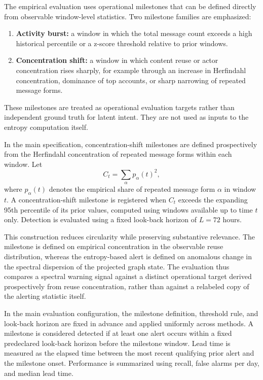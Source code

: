 \documentclass[sigconf]{acmart}
\begin{document}
The empirical evaluation uses operational milestones that can be defined directly from observable window-level statistics. Two milestone families are emphasized:
\begin{enumerate}
    \item \textbf{Activity burst:} a window in which the total message count exceeds a high historical percentile or a z-score threshold relative to prior windows.
    \item \textbf{Concentration shift:} a window in which content reuse or actor concentration rises sharply, for example through an increase in Herfindahl concentration, dominance of top accounts, or sharp narrowing of repeated message forms.
\end{enumerate}

These milestones are treated as operational evaluation targets rather than independent ground truth for latent intent. They are not used as inputs to the entropy computation itself.

In the main specification, concentration-shift milestones are defined prospectively from the Herfindahl concentration of repeated message forms within each window. Let
\begin{equation}
C_t = \sum_{\alpha} p_{\alpha}(t)^2,
\end{equation}
where $p_{\alpha}(t)$ denotes the empirical share of repeated message form $\alpha$ in window $t$. A concentration-shift milestone is registered when $C_t$ exceeds the expanding 95th percentile of its prior values, computed using windows available up to time $t$ only. Detection is evaluated using a fixed look-back horizon of $L = 72$ hours.

This construction reduces circularity while preserving substantive relevance. The milestone is defined on empirical concentration in the observable reuse distribution, whereas the entropy-based alert is defined on anomalous change in the spectral dispersion of the projected graph state. The evaluation thus compares a spectral warning signal against a distinct operational target derived prospectively from reuse concentration, rather than against a relabeled copy of the alerting statistic itself.

In the main evaluation configuration, the milestone definition, threshold rule, and look-back horizon are fixed in advance and applied uniformly across methods. A milestone is considered detected if at least one alert occurs within a fixed predeclared look-back horizon before the milestone window. Lead time is measured as the elapsed time between the most recent qualifying prior alert and the milestone onset. Performance is summarized using recall, false alarms per day, and median lead time.
\end{document}
